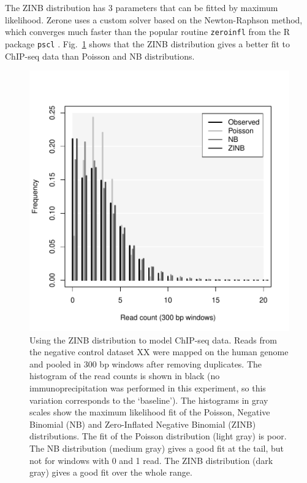 \documentclass{bioinfo}
\begin{document}
\begin{methods}
The ZINB distribution has 3 parameters that can be fitted by maximum
likelihood. Zerone uses a custom solver based on the Newton-Raphson
method, which converges much faster than the popular routine
\texttt{zeroinfl} from the R package \texttt{pscl} \citep{R}.
Fig.~\ref{fig:ZINB_fit} shows that the ZINB distribution gives a better
fit to ChIP-seq data than Poisson and NB distributions.

\begin{figure}[!tpb]
\centerline{\includegraphics[scale=0.55]{ZINB_fit.pdf}}
\caption{Using the ZINB distribution to model ChIP-seq data. Reads from
the negative control dataset XX were mapped on the human genome and pooled
in 300 bp windows after removing duplicates. The histogram of the read
counts is shown in black (no immunoprecipitation was performed in this
experiment, so this variation corresponds to the `baseline'). The
histograms in gray scales show the maximum likelihood fit of the Poisson,
Negative Binomial (NB) and Zero-Inflated Negative Binomial (ZINB)
distributions. The fit of the Poisson distribution (light gray) is poor.
The NB distribution (medium gray) gives a good fit at the tail, but not
for windows with 0 and 1 read. The ZINB distribution (dark gray) gives
a good fit over the whole range.
}\label{fig:ZINB_fit}
\end{figure}


\end{methods}
\end{document}
